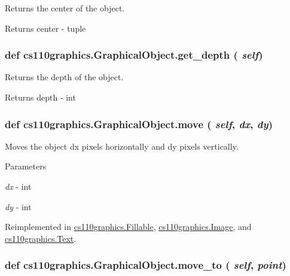 Returns the center of the object. \begin{DoxyReturn}{Returns}
center -\/ tuple 
\end{DoxyReturn}
\hypertarget{classcs110graphics_1_1GraphicalObject_a6d9f5718cd0cf249e0d2842971bae17f}{
\subsubsection[{get\_\-depth}]{\setlength{\rightskip}{0pt plus 5cm}def cs110graphics.GraphicalObject.get\_\-depth ( {\em self})}}
\label{classcs110graphics_1_1GraphicalObject_a6d9f5718cd0cf249e0d2842971bae17f}


Returns the depth of the object. \begin{DoxyReturn}{Returns}
depth -\/ int 
\end{DoxyReturn}
\hypertarget{classcs110graphics_1_1GraphicalObject_aa64d270fb83efa4a54e1a7953512f9cd}{
\subsubsection[{move}]{\setlength{\rightskip}{0pt plus 5cm}def cs110graphics.GraphicalObject.move ( {\em self}, \/   {\em dx}, \/   {\em dy})}}
\label{classcs110graphics_1_1GraphicalObject_aa64d270fb83efa4a54e1a7953512f9cd}


Moves the object dx pixels horizontally and dy pixels vertically. 
\begin{DoxyParams}{Parameters}
\item[{\em dx}]-\/ int \item[{\em dy}]-\/ int \end{DoxyParams}


Reimplemented in \hyperlink{classcs110graphics_1_1Fillable_ae8f6c476e29c0810453dc16948e1730c}{cs110graphics.Fillable}, \hyperlink{classcs110graphics_1_1Image_a540d48247976343a91c610009a9af8cd}{cs110graphics.Image}, and \hyperlink{classcs110graphics_1_1Text_a6bd6f174fc82f2225a4d162ca6b90ec2}{cs110graphics.Text}.\hypertarget{classcs110graphics_1_1GraphicalObject_abe2d480265df7ac9447205c52c6946df}{
\subsubsection[{move\_\-to}]{\setlength{\rightskip}{0pt plus 5cm}def cs110graphics.GraphicalObject.move\_\-to ( {\em self}, \/   {\em point})}}
\label{classcs110graphics_1_1GraphicalObject_abe2d480265df7ac9447205c52c6946df}


